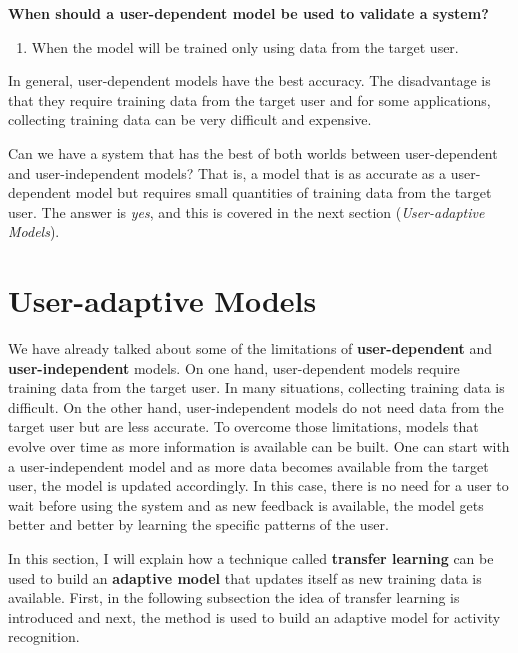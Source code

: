 \documentclass[
  11pt,
]{krantz}
\providecommand{\tightlist}{%
  \setlength{\itemsep}{0pt}\setlength{\parskip}{0pt}}
\begin{document}
\textbf{When should a user-dependent model be used to validate a system?}

\begin{enumerate}
\def\labelenumi{\arabic{enumi}.}
\tightlist
\item
  When the model will be trained only using data from the target user.
\end{enumerate}

In general, user-dependent models have the best accuracy. The disadvantage is that they require training data from the target user and for some applications, collecting training data can be very difficult and expensive.

Can we have a system that has the best of both worlds between user-dependent and user-independent models? That is, a model that is as accurate as a user-dependent model but requires small quantities of training data from the target user. The answer is \emph{yes}, and this is covered in the next section (\emph{User-adaptive Models}).

\hypertarget{user-adaptive-models}{%
\section{User-adaptive Models}\label{user-adaptive-models}}

We have already talked about some of the limitations of \textbf{user-dependent} and \textbf{user-independent} models. On one hand, user-dependent models require training data from the target user. In many situations, collecting training data is difficult. On the other hand, user-independent models do not need data from the target user but are less accurate. To overcome those limitations, models that evolve over time as more information is available can be built. One can start with a user-independent model and as more data becomes available from the target user, the model is updated accordingly. In this case, there is no need for a user to wait before using the system and as new feedback is available, the model gets better and better by learning the specific patterns of the user.

In this section, I will explain how a technique called \textbf{transfer learning} can be used to build an \textbf{adaptive model} that updates itself as new training data is available. First, in the following subsection the idea of transfer learning is introduced and next, the method is used to build an adaptive model for activity recognition.
\end{document}
